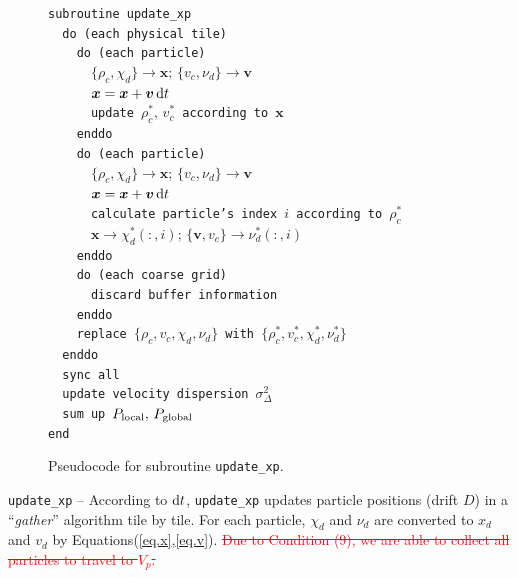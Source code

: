 \documentclass[10pt,twocolumn,preprint]{emulateapj}
\newcommand{\bs}{\boldsymbol}
\newcommand{\tcr}{\textcolor{red}}
\begin{document}
\begin{figure}[t]
{\tt subroutine update\_xp\\
\indent \ \ do (each physical tile)\\
\indent \ \ \ \ do (each particle)\\
\indent \ \ \ \ \ \ $\{\rho_c,\chi_d\}\rightarrow {\bs x};\,\{v_c,\nu_d\}\rightarrow {\bs v}$\\
\indent \ \ \ \ \ \ ${\bs x}={\bs x}+{\bs v}\,{\rm d}t$\\
\indent \ \ \ \ \ \ update $\rho_c^*,\,v_c^*$ according to ${\bs x}$\\
\indent \ \ \ \ enddo\\
\indent \ \ \ \ do (each particle)\\
\indent \ \ \ \ \ \ $\{\rho_c,\chi_d\}\rightarrow {\bs x};\,\{v_c,\nu_d\}\rightarrow {\bs v}$\\
\indent \ \ \ \ \ \ ${\bs x}={\bs x}+{\bs v}\,{\rm d}t$\\
\indent \ \ \ \ \ \ calculate particle's index $i$ according to $\rho_c^*$\\
\indent \ \ \ \ \ \ ${\bs x}\rightarrow\chi_d^*(:,i);\,\{{\bs v},v_c\}\rightarrow\nu_d^*(:,i)$\\
\indent \ \ \ \ enddo\\
\indent \ \ \ \ do (each coarse grid)\\
\indent \ \ \ \ \ \ discard buffer information\\
\indent \ \ \ \ enddo\\
\indent \ \ \ \ replace $\{\rho_c,v_c,\chi_d,\nu_d\}$ with $\{\rho_c^*,v_c^*,\chi_d^*,\nu_d^*\}$\\
\indent \ \ enddo\\
\indent \ \ sync all\\
\indent \ \ update velocity dispersion $\sigma^2_{\Delta}$\\
\indent \ \ sum up $P_{\rm local},\,P_{\rm global}$\\
end\\}
\caption{Pseudocode for subroutine {\tt update\_xp}.}
\label{fig.update_xp}
\end{figure}


{\tt update\_xp} --
According to ${\rm d}t$, {\tt update\_xp} updates particle positions (drift $D$) in a ``{\it gather}'' algorithm tile by tile. For each particle, $\chi_d$ and $\nu_d$ are converted to $x_d$ and $v_d$ by Equations(\ref{eq.x},\ref{eq.v}). \tcr{\sout{Due to Condition (9), we are able to collect all particles to travel to $V_p$.}}
\end{document}
